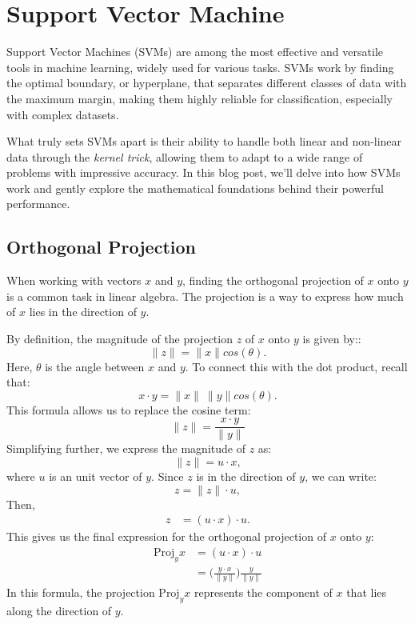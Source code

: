 \chapter{Support Vector Machine}
Support Vector Machines (SVMs) are among the most effective and versatile tools in machine learning, widely used for various tasks. SVMs work by finding the optimal boundary, or hyperplane, that separates different classes of data with the maximum margin, making them highly reliable for classification, especially with complex datasets.

What truly sets SVMs apart is their ability to handle both linear and non-linear data through the \textit{kernel trick}, allowing them to adapt to a wide range of problems with impressive accuracy. In this blog post, we'll delve into how SVMs work and gently explore the mathematical foundations behind their powerful performance.


\section{Orthogonal Projection}
When working with vectors $x$ and $y$, finding the orthogonal projection of $x$ onto $y$ is a common task in linear algebra. The projection is a way to express how much of $x$ lies in the direction of $y$.

By definition, the magnitude of the projection $z$ of $x$ onto $y$ is given by::
$$\lVert z\rVert  = \lVert x\rVert cos(\theta).$$
Here, $\theta$ is the angle between $x$ and $y$. To connect this with the dot product, recall that:
$$x\cdot y = \lVert x\rVert \ \lVert y\rVert  cos(\theta).$$
This formula allows us to replace the cosine term:
$$\lVert z\rVert  =  \frac{x\cdot y}{\lVert y\rVert }$$
Simplifying further, we express the magnitude of $z$ as:
$$\lVert z\rVert = u\cdot x,$$
where $u$ is an unit vector of $y$. Since $z$ is in the direction of $y$, we can write:
$$z = \lVert z\rVert \cdot u,$$
Then, 
\begin{align*}
	z &= (u\cdot x)\cdot u.
\end{align*}
This gives us the final expression for the orthogonal projection of $x$ onto $y$:
\begin{align*}
	\textrm{Proj}_yx &= (u\cdot x)\cdot u\\ 
					 &= \Bigg(\frac{y\cdot x}{\lVert y\rVert }\Bigg)\frac{y}{\lVert y\rVert }
\end{align*}
In this formula, the projection $\textrm{Proj}_yx$ represents the component of $x$ that lies along the direction of $y$.

